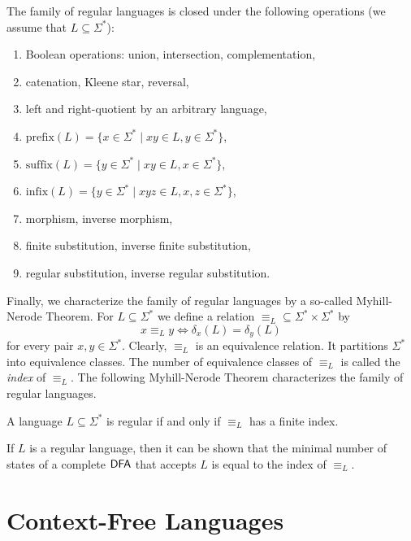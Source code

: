 \begin{theorem}
The family of regular languages is closed under the following operations (we assume that $L \subseteq \Sigma^*$):
\begin{enumerate}
\item Boolean operations: union, intersection, complementation,
\item catenation, Kleene star, reversal,
\item left and right-quotient by an arbitrary language,
\item $\text{prefix}(L) = \{x \in \Sigma^* \mid xy \in L, y \in \Sigma^*\}$,
\item $\text{suffix}(L) = \{y \in \Sigma^* \mid xy \in L, x \in \Sigma^*\}$,
\item $\text{infix}(L) = \{y \in \Sigma^* \mid xyz \in L, x,z \in \Sigma^*\}$,
\item morphism, inverse morphism,
\item finite substitution, inverse finite substitution,
\item regular substitution, inverse regular substitution.
\end{enumerate}
\end{theorem}

Finally, we characterize the family of regular languages by a so-called Myhill-Nerode Theorem. For $L \subseteq \Sigma^*$ we define a relation $\equiv_L \subseteq \Sigma^* \times \Sigma^*$ by
$$x \equiv_L y \Leftrightarrow \delta_x(L) = \delta_y(L)$$
for every pair $x, y \in \Sigma^*$. Clearly, $\equiv_L$ is an equivalence relation. It partitions $\Sigma^*$ into equivalence classes. The number of equivalence classes of $\equiv_L$ is called the \emph{index} of $\equiv_L$. The following Myhill-Nerode Theorem characterizes the family of regular languages.

\begin{theorem}
A language $L \subseteq \Sigma^*$ is regular if and only if $\equiv_L$ has a finite index.
\end{theorem}

If $L$ is a regular language, then it can be shown that the minimal number of states of a complete $\textup{\sf DFA}$ that accepts $L$ is equal to the index of $\equiv_L$.

\section{Context-Free Languages}
\label{section:context-free-languages}

